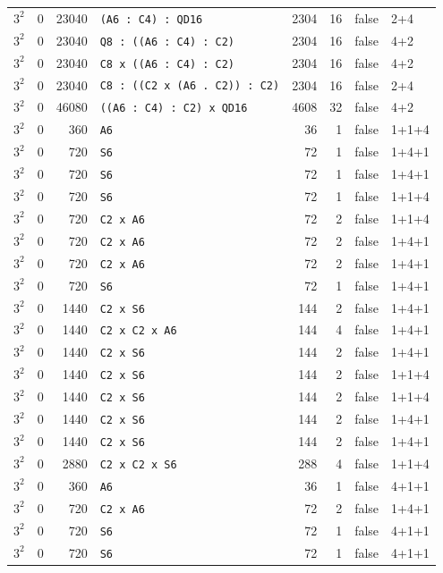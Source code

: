\begin{longtable}{llrlrrll}
$3^2$ & 0 & 23040 & \texttt{(A6 : C4) : QD16} & 2304 & 16 & false & 2+4\\
$3^2$ & 0 & 23040 & \texttt{Q8 : ((A6 : C4) : C2)} & 2304 & 16 & false & 4+2\\
$3^2$ & 0 & 23040 & \texttt{C8 x ((A6 : C4) : C2)} & 2304 & 16 & false & 4+2\\
$3^2$ & 0 & 23040 & \texttt{C8 : ((C2 x (A6 . C2)) : C2)} & 2304 & 16 & false & 2+4\\
$3^2$ & 0 & 46080 & \texttt{((A6 : C4) : C2) x QD16} & 4608 & 32 & false & 4+2\\
$3^2$ & 0 & 360 & \texttt{A6} & 36 & 1 & false & 1+1+4\\
$3^2$ & 0 & 720 & \texttt{S6} & 72 & 1 & false & 1+4+1\\
$3^2$ & 0 & 720 & \texttt{S6} & 72 & 1 & false & 1+4+1\\
$3^2$ & 0 & 720 & \texttt{S6} & 72 & 1 & false & 1+1+4\\
$3^2$ & 0 & 720 & \texttt{C2 x A6} & 72 & 2 & false & 1+1+4\\
$3^2$ & 0 & 720 & \texttt{C2 x A6} & 72 & 2 & false & 1+4+1\\
$3^2$ & 0 & 720 & \texttt{C2 x A6} & 72 & 2 & false & 1+4+1\\
$3^2$ & 0 & 720 & \texttt{S6} & 72 & 1 & false & 1+4+1\\
$3^2$ & 0 & 1440 & \texttt{C2 x S6} & 144 & 2 & false & 1+4+1\\
$3^2$ & 0 & 1440 & \texttt{C2 x C2 x A6} & 144 & 4 & false & 1+4+1\\
$3^2$ & 0 & 1440 & \texttt{C2 x S6} & 144 & 2 & false & 1+4+1\\
$3^2$ & 0 & 1440 & \texttt{C2 x S6} & 144 & 2 & false & 1+1+4\\
$3^2$ & 0 & 1440 & \texttt{C2 x S6} & 144 & 2 & false & 1+1+4\\
$3^2$ & 0 & 1440 & \texttt{C2 x S6} & 144 & 2 & false & 1+4+1\\
$3^2$ & 0 & 1440 & \texttt{C2 x S6} & 144 & 2 & false & 1+4+1\\
$3^2$ & 0 & 2880 & \texttt{C2 x C2 x S6} & 288 & 4 & false & 1+1+4\\
$3^2$ & 0 & 360 & \texttt{A6} & 36 & 1 & false & 4+1+1\\
$3^2$ & 0 & 720 & \texttt{C2 x A6} & 72 & 2 & false & 1+4+1\\
$3^2$ & 0 & 720 & \texttt{S6} & 72 & 1 & false & 4+1+1\\
$3^2$ & 0 & 720 & \texttt{S6} & 72 & 1 & false & 4+1+1\\

\end{longtable}
